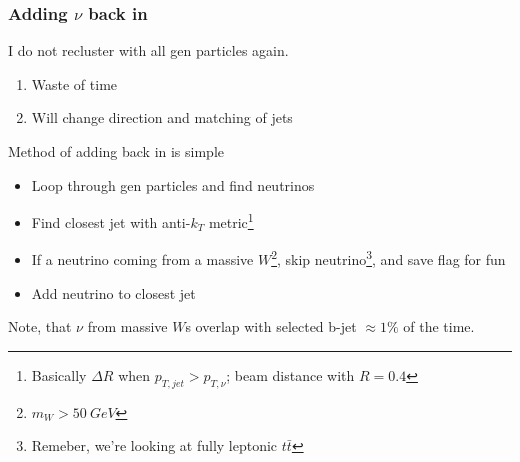 \documentclass{beamer}
\newcommand{\ttbar}{\ensuremath{t\bar{t}}}
\begin{document}
\begin{frame}
  \frametitle{Adding $\nu$ back in}

  I do not recluster with all gen particles again.

  \begin{enumerate}
  \item Waste of time
  \item Will change direction and matching of jets
  \end{enumerate}

  Method of adding back in is simple

  \begin{itemize}
  \item Loop through gen particles and find neutrinos
  \item Find closest jet with anti-$k_T$ metric\footnote{
    Basically $\Delta R$ when $p_{T,jet} > p_{T,\nu}$; beam distance with $R = 0.4$}
  \item If a neutrino coming from a massive $W$\footnote{$m_W > \SI{50}{GeV}$},
    skip neutrino\footnote{Remeber, we're looking at fully leptonic \ttbar},
    and save flag for fun
  \item Add neutrino to closest jet
  \end{itemize}

  Note, that $\nu$ from massive $W$s overlap with selected b-jet $\approx 1\%$ of the time.

\end{frame}
\end{document}
